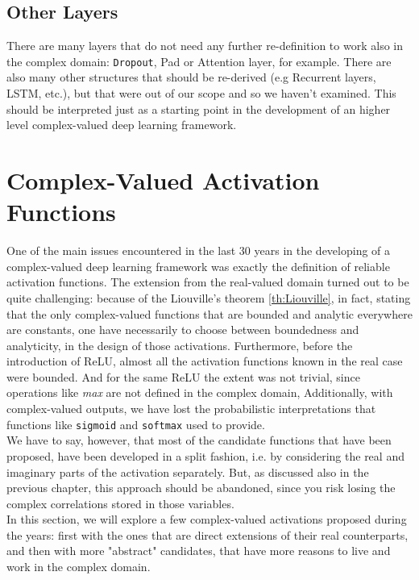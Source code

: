 \documentclass[../main.tex]{subfiles}
\begin{document}
\subsection*{Other Layers}
There are many layers that do not need any further re-definition to work also in the complex domain: \texttt{Dropout}, Pad or Attention layer, for example. There are also many other structures that should be re-derived (e.g Recurrent layers, LSTM, etc.), but that were out of our scope and so we haven't examined. This should be interpreted just as a starting point in the development of an higher level complex-valued deep learning framework.

\section{Complex-Valued Activation Functions}
One of the main issues encountered in the last 30 years in the developing of a complex-valued deep learning framework was exactly the definition of reliable activation functions. The extension from the real-valued domain turned out to be quite challenging: because of the Liouville's theorem \ref{th:Liouville}, in fact, stating that the only complex-valued functions that are bounded and analytic everywhere are constants, one have necessarily to choose between boundedness and analyticity, in the design of those activations. Furthermore, before the introduction of ReLU, almost all the activation functions known in the real case were bounded. And for the same ReLU the extent was not trivial, since operations like \textit{max} are not defined in the complex domain, Additionally, with complex-valued outputs, we have lost the probabilistic interpretations that functions like \texttt{sigmoid} and \texttt{softmax} used to provide.\\
We have to say, however, that most of the candidate functions that have been proposed, have been developed in a split fashion, i.e. by considering the real and imaginary parts of the activation separately. But, as discussed also in the previous chapter, this approach should be abandoned, since you risk losing the complex correlations stored in those variables.\\
In this section, we will explore a few complex-valued activations proposed during the years: first with the ones that are direct extensions of their real counterparts, and then with more "abstract" candidates, that have more reasons to live and work in the complex domain.
\end{document}
